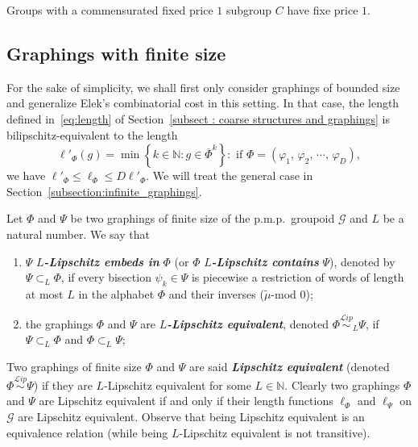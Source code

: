 \documentclass[AHL,Unicode,longabstracts,published]{cedram}
\newcommand{\defin}[1]{\textbf{\emph{#1}}}
\newcommand{\Nmath}{\mathbb{N}}
\newcommand{\cg}{\mathcal{G}}
\newcommand{\ph}{\varphi}
\newcommand{\pmp}{p.m.p.\ }
\newcommand\Lipeq{\overset{\mathcal{L}ip}{\sim}}
\begin{document}
\begin{coro}\label{cor: cost 1 commensurated}
Groups with a commensurated fixed price $1$ subgroup $C$ have fixe price $1$.
\end{coro}


\subsection{Graphings with finite size}\label{subsection:finite_graphings}


For the sake of simplicity, we shall first only consider graphings of bounded size and generalize Elek's combinatorial cost in this setting. In that case, the length defined in~\eqref{eq:length} of Section~\ref{subsect : coarse structures and graphings} is bilipschitz-equivalent to the length
\[
\ell'_\Phi(g) = \min\left\{k \in \Nmath: g \in \overline{\Phi}^k \right\}:\text{ if }\Phi = \left(\ph_1, \,\ph_2,\,\cdots,\,\ph_D\right),
\]
we have $\ell'_\Phi \leq \ell_\Phi \leq D \ell'_\Phi$. We will treat the general case in Section~\ref{subsection:infinite_graphings}.

\begin{defi}\label{def:Lipschitz-contain-equiv-graphins}
Let $\Phi$ and $\Psi$ be two graphings of finite size of the \pmp groupoid $\cg$ and $L$ be a natural number. We say that
\begin{enumerate}
\item \label{defi3.4.1}$\Psi$ \defin{$L$-Lipschitz embeds in} $\Phi$ (or $\Phi$
\defin{$L$-Lipschitz contains} $\Psi$), denoted by $\Psi\subset_L \Phi$, if every bisection $\psi_k\in\Psi$ is piecewise a restriction of words of length at most $L$ in the alphabet $\Phi$ and their inverses ($\widetilde{\mu}$-mod $0$);
\item \label{defi3.4.2}the graphings $\Phi$ and $\Psi$ are
\defin{$L$-Lipschitz equivalent}, denoted $\Phi\Lipeq_L\Psi$, if $\Psi\subset_L \Phi$ and $\Phi \subset_L \Psi$;
\end{enumerate}
\end{defi}

Two graphings of finite size $\Phi$ and $\Psi$ are said
\defin{Lipschitz equivalent} (denoted $\Phi\Lipeq\Psi$) if they are $L$-Lipschitz equivalent for some $L \in \Nmath$. Clearly two graphings $\Phi$ and $\Psi$ are Lipschitz equivalent if and only if their length functions $\ell_\Phi$ and $\ell_\Psi$ on $\cg$ are Lipschitz equivalent. Observe that being Lipschitz equivalent is an equivalence relation (while being $L$-Lipschitz equivalent is not transitive).
\end{document}
